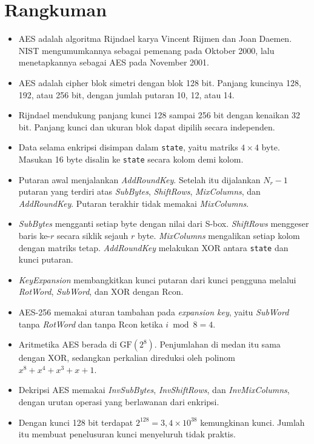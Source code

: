 \section{Rangkuman}
\begin{itemize}
    \item AES adalah algoritma Rijndael karya Vincent Rijmen dan Joan Daemen.
    NIST mengumumkannya sebagai pemenang pada Oktober 2000, lalu menetapkannya
    sebagai AES pada November 2001.
    \item AES adalah cipher blok simetri dengan blok 128 bit. Panjang kuncinya
    128, 192, atau 256 bit, dengan jumlah putaran 10, 12, atau 14.
    \item Rijndael mendukung panjang kunci 128 sampai 256 bit dengan kenaikan
    32 bit. Panjang kunci dan ukuran blok dapat dipilih secara independen.
    \item Data selama enkripsi disimpan dalam \texttt{state}, yaitu matriks
    $4 \times 4$ byte. Masukan 16 byte disalin ke \texttt{state} secara kolom
    demi kolom.
    \item Putaran awal menjalankan \textit{AddRoundKey}. Setelah itu dijalankan
    $N_r - 1$ putaran yang terdiri atas \textit{SubBytes}, \textit{ShiftRows},
    \textit{MixColumns}, dan \textit{AddRoundKey}. Putaran terakhir tidak
    memakai \textit{MixColumns}.
    \item \textit{SubBytes} mengganti setiap byte dengan nilai dari S-box.
    \textit{ShiftRows} menggeser baris ke-$r$ secara siklik sejauh $r$ byte.
    \textit{MixColumns} mengalikan setiap kolom dengan matriks tetap.
    \textit{AddRoundKey} melakukan XOR antara \texttt{state} dan kunci putaran.
    \item \textit{KeyExpansion} membangkitkan kunci putaran dari kunci pengguna
    melalui \textit{RotWord}, \textit{SubWord}, dan XOR dengan Rcon.
    \item AES-256 memakai aturan tambahan pada \textit{expansion key}, yaitu
    \textit{SubWord} tanpa \textit{RotWord} dan tanpa Rcon ketika
    $i \bmod 8 = 4$.
    \item Aritmetika AES berada di $\text{GF}(2^8)$. Penjumlahan di medan itu
    sama dengan XOR, sedangkan perkalian direduksi oleh polinom
    $x^8 + x^4 + x^3 + x + 1$.
    \item Dekripsi AES memakai \textit{InvSubBytes}, \textit{InvShiftRows}, dan
    \textit{InvMixColumns}, dengan urutan operasi yang berlawanan dari enkripsi.
    \item Dengan kunci 128 bit terdapat $2^{128} = 3{,}4 \times 10^{38}$
    kemungkinan kunci. Jumlah itu membuat penelusuran kunci menyeluruh tidak
    praktis.
\end{itemize}
